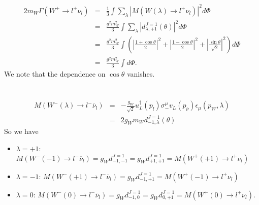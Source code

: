 \documentclass[11pt]{article}
\def\dgr{\dagger}
\def\eps{\epsilon}
\def\lmd{\lambda}
\def\th{\theta}
\begin{document}
\section{ }
\begin{eqnarray}
  2 m_W \Gamma(W^+ \to l^+ \nu_l)
&=& \frac{1}{3} \int \sum_{\lambda} |M(W(\lmd)\to l^+ \nu_l)|^2  d\Phi \\
&=& \frac{g^2m_W^2}{3} \int \sum_{\lambda} |d_{\lmd,+1}^{J=1}(\th)|^2  d\Phi \\
&=& \frac{g^2m_W^2}{3} \int (| \frac{1 + \cos\theta}{2}   |^2
+ | \frac{1 - \cos\theta}{2}   |^2
+ | \frac{\sin\theta}{\sqrt{2}} |^2)  d\Phi \\
&=&\frac{g^2m_W^2}{3} \int d\Phi.
\end{eqnarray}
We note that the dependence on $\cos\th$ vanishes.

\section{ }
\begin{eqnarray}
  M(W^-(\lmd) \to l^- {\overline \nu_l}) &=& -\frac{g_W}{\sqrt 2} u^\dgr_L(p_l) \sigma^\mu_- v_L(p_{\overline \nu}) \eps_\mu (p_W,\lmd) \\
  &=&2 g_W m_W d^{J=1}_{-1,\lmd}(\th)
\end{eqnarray}
So we have
\begin{itemize}
  \item $\lmd=+1$: $M(W^-(-1) \to l^- {\overline \nu_l})=g_W d^{J=1}_{-1,-1}=g_W d^{J=1}_{+1,+1}=M(W^+ (+1) \to l^+ \nu_l)$
  \item $\lmd=-1$: $M(W^-(+1) \to l^- {\overline \nu_l})=g_W d^{J=1}_{-1,+1}=M(W^+ (-1) \to l^+ \nu_l)$
  \item $\lmd=0$: $M(W^-(0) \to l^- {\overline \nu_l})=g_W d^{J=1}_{-1,0}=g_W d^{J=1}_{0,+1}=M(W^+ (0) \to l^+ \nu_l)$.
\end{itemize}
\end{document}
